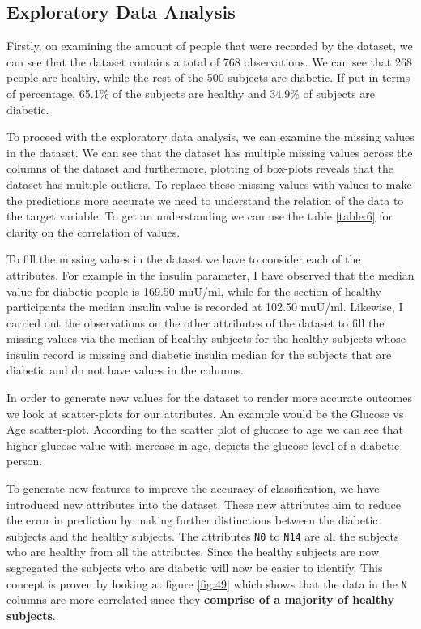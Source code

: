 \documentclass[12pt]{article}
\begin{document}
\subsection{Exploratory Data Analysis}
Firstly, on examining the amount of people that were recorded by the dataset, we can see that the dataset contains a total of 768 observations. We can see that 268 people are healthy, while the rest of the 500 subjects are diabetic. If put in terms of percentage, 65.1\% of the subjects are healthy and 34.9\% of subjects are diabetic.

To proceed with the exploratory data analysis, we can examine the missing values in the dataset. We can see that the dataset has multiple missing values across the columns of the dataset and furthermore, plotting of box-plots reveals that the dataset has multiple outliers. To replace these missing values with values to make the predictions more accurate we need to understand the relation of the data to the target variable. To get an understanding we can use the table \ref{table:6} for clarity on the correlation of values.

To fill the missing values in the dataset we have to consider each of the attributes. For example in the insulin parameter, I have observed that the median value for diabetic people is 169.50 muU/ml, while for the section of healthy participants the median insulin value is recorded at 102.50 muU/ml. Likewise, I carried out the observations on the other attributes of the dataset to fill the missing values via the median of healthy subjects for the healthy subjects whose insulin record is missing and diabetic insulin median for the subjects that are diabetic and do not have values in the columns.

In order to generate new values for the dataset to render more accurate outcomes we look at scatter-plots for our attributes. An example would be the Glucose vs Age scatter-plot. According to the scatter plot of glucose to age we can see that higher glucose value with increase in age, depicts the glucose level of a diabetic person.

To generate new features to improve the accuracy of classification, we have introduced new attributes into the dataset. These new attributes aim to reduce the error in prediction by making further distinctions between the diabetic subjects and the healthy subjects. The attributes \texttt{N0} to \texttt{N14} are all the subjects who are healthy from all the attributes. Since the healthy subjects are now segregated the subjects who are diabetic will now be easier to identify. This concept is      proven by looking at figure \ref{fig:49} which shows that the data in the \texttt{N} columns are more correlated since they \textbf{comprise of a majority of healthy subjects}.
\end{document}
